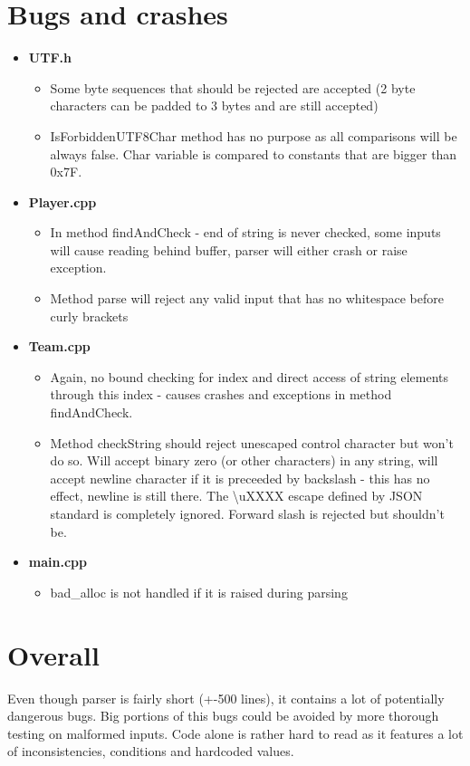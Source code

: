 \documentclass[10pt,a4paper]{article}
\begin{document}
\section*{Bugs and crashes}
\begin{itemize}
	\item \textbf{UTF.h}
	\begin{itemize}
		\item Some byte sequences that should be rejected are accepted (2 byte characters can be padded to 3 bytes and are still accepted)
		\item IsForbiddenUTF8Char method has no purpose as all comparisons will be always false. Char variable is compared to constants that are bigger than 0x7F.
	\end{itemize}
	\item \textbf{Player.cpp} 
	\begin{itemize}
		\item In method findAndCheck - end of string is never checked, some inputs will cause reading behind buffer, parser will either crash or raise exception.
		\item Method parse will reject any valid input that has no whitespace before curly brackets
	\end{itemize}
	\item \textbf{Team.cpp}
	\begin{itemize}
		\item Again, no bound checking for index and direct access of string elements through this index - causes crashes and exceptions in method findAndCheck.
		\item Method checkString should reject unescaped control character but won't do so. Will accept binary zero (or other characters) in any string, will accept newline character if it is preceeded by backslash - this has no effect, newline is still there. The \textbackslash uXXXX escape defined by JSON standard is completely ignored. Forward slash is rejected but shouldn't be.
	\end{itemize}
	\item \textbf{main.cpp}
	\begin{itemize}
		\item bad\_alloc is not handled if it is raised during parsing
	\end{itemize}
\end{itemize}

\section*{Overall}
Even though parser is fairly short (+-500 lines), it contains a lot of potentially dangerous bugs. Big portions of this bugs could be avoided by more thorough testing on malformed inputs. Code alone is rather hard to read as it features a lot of inconsistencies, conditions and hardcoded values.
\end{document}
